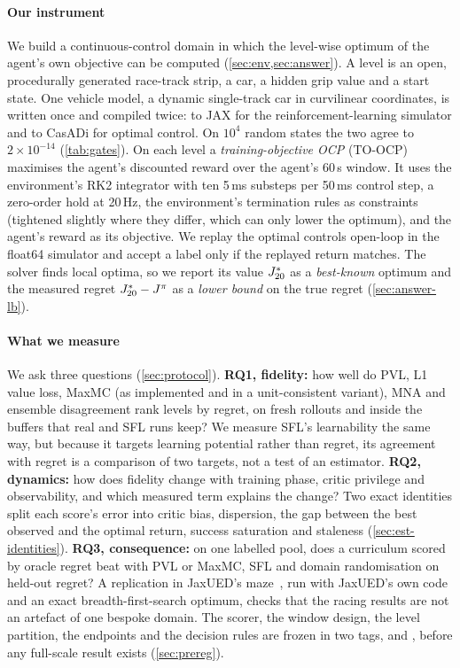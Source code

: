 \paragraph{Our instrument} We build a continuous-control domain in which the level-wise
optimum of the agent's own objective can be computed (\cref{sec:env,sec:answer}). A level
is an open, procedurally generated race-track strip, a car, a hidden grip value and a
start state. One vehicle model, a dynamic single-track car in curvilinear coordinates,
is written once and compiled twice: to JAX for the reinforcement-learning simulator and to
CasADi for optimal control. On $10^{4}$ random states the two agree to
$2\times10^{-14}$ (\cref{tab:gates}). On each level a
\emph{training-objective OCP} (TO-OCP) maximises the agent's discounted reward over the
agent's 60\,s window. It uses the environment's RK2 integrator with ten 5\,ms substeps per
50\,ms control step, a zero-order hold at 20\,Hz, the environment's termination rules as
constraints (tightened slightly where they differ, which can only lower the optimum), and
the agent's reward as its objective. We replay the optimal controls
open-loop in the float64 simulator and accept a label only if the replayed return matches.
The solver finds local optima, so we report its value $J^{*}_{20}$ as a \emph{best-known}
optimum and the measured regret $J^{*}_{20} - J^{\pi}$ as a \emph{lower bound} on the true
regret (\cref{sec:answer-lb}).

\paragraph{What we measure} We ask three questions (\cref{sec:protocol}). \textbf{RQ1,
fidelity:} how well do PVL, L1 value loss, MaxMC (as implemented and in a unit-consistent
variant), MNA and ensemble disagreement rank levels by regret, on fresh rollouts and
inside the buffers that real \PLRp{} and SFL runs keep? We measure SFL's learnability
the same way, but because it targets learning potential rather than regret, its
agreement with regret is a comparison of two targets, not a test of an
estimator. \textbf{RQ2,
dynamics:} how does fidelity change with training phase, critic privilege and
observability, and which measured term explains the change? Two exact identities split
each score's error into critic bias, dispersion, the gap between the best observed and
the optimal return, success saturation and staleness (\cref{sec:est-identities}).
\textbf{RQ3, consequence:} on one labelled pool, does a \PLRp{} curriculum scored by
oracle regret beat \PLRp{} with PVL or MaxMC, SFL and domain randomisation on held-out
regret? A replication in JaxUED's maze~\citep{coward2024jaxued}, run with JaxUED's own
code and an exact breadth-first-search optimum, checks that the racing results are not an
artefact of one bespoke domain. The scorer, the window design, the level partition, the
endpoints and the decision rules are frozen in two tags,  and
, before any full-scale result exists (\cref{sec:prereg}).


